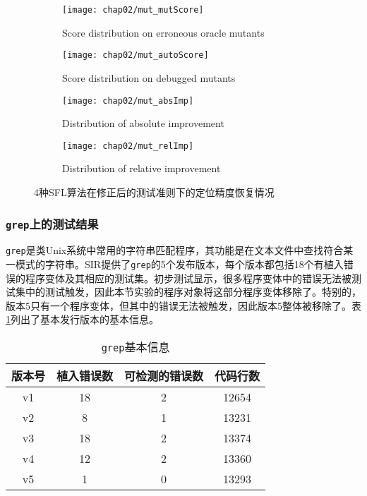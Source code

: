 \begin{figure}
	\centering
	\begin{subfigure}{15cm}
		\texttt{[image: chap02/mut\_mutScore]}
		\caption{Score distribution on erroneous oracle mutants}
		\label{fig: mutScore}
	\end{subfigure}%
\hspace{0.5cm}
	\begin{subfigure}{15cm}
		\texttt{[image: chap02/mut\_autoScore]}
		\caption{Score distribution on debugged mutants}
		\label{fig: autoScore}
	\end{subfigure}%
\hspace{0.5cm}
	\begin{subfigure}{15cm}
		\texttt{[image: chap02/mut\_absImp]}
		\caption{Distribution of absolute improvement}
		\label{fig: mut-absImp}
	\end{subfigure}%
\hspace{0.5cm}
	\begin{subfigure}{15cm}
		\texttt{[image: chap02/mut\_relImp]}
		\caption{Distribution of relative improvement}
		\label{fig: mut-relImp}
	\end{subfigure}%
	
	\caption{4种SFL算法在修正后的测试准则下的定位精度恢复情况}
	\label{fig: perfomance_improvement}	
\end{figure}
\subsubsection{\texttt{grep}上的测试结果}

\texttt{grep}是类Unix系统中常用的字符串匹配程序，其功能是在文本文件中查找符合某一模式的字符串。SIR\cite{doESE05}提供了\texttt{grep}的5个发布版本，每个版本都包括18个有植入错误的程序变体及其相应的测试集。初步测试显示，很多程序变体中的错误无法被测试集中的测试触发，因此本节实验的程序对象将这部分程序变体移除了。特别的，版本5只有一个程序变体，但其中的错误无法被触发，因此版本5整体被移除了。表\ref{Tab: grep-info}列出了基本发行版本的基本信息。

\begin{table}
	\caption{\texttt{grep}基本信息} \label{Tab: grep-info}
	\centering
	\begin{tabular}{c|c|c|c}
		\hline 版本号 & 植入错误数 & 可检测的错误数 & 代码行数 \\ 
		\hline v1 & 18 & 2 & 12654 \\ 
		\hline v2 & 8 & 1 & 13231 \\ 
		\hline v3 & 18 & 2 & 13374 \\ 
		\hline v4 & 12 & 2 & 13360 \\ 
		\hline v5 & 1 & 0 & 13293 \\ 
		\hline
	\end{tabular} 
\end{table}

